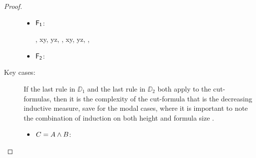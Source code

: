 \begin{proof}
\begin{description}
\begin{itemize}
\item$\mathsf{F_1}$:
\begin{smallequation*}
	{\B, \accs xy, \futs yz, \Left \SEQ \Right}
	{
		{\B, \accs xy, \futs yz, \Left \SEQ \Right, }
		{}}
	{}
\end{smallequation*}

\item$\mathsf{F_2}$:
\begin{smallequation*}
	{}
	{}
\end{smallequation*}

\end{itemize}
              \item[Key cases:]\label{key-cases}
                If the last rule in $\DD_1$ and the last rule in $\DD_2$ both apply to the cut-formulas, then it is the complexity of the cut-formula that is the decreasing inductive measure, save for the modal cases, where it is important to note the combination of induction on both height and formula size . 
                \begin{itemize}
				\item $C=A \mathbin{\wedge} B$:
				

\end{itemize}
\end{description}
\end{proof}
